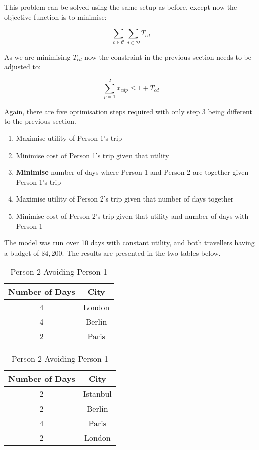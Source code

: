 \documentclass[12pt]{article}
\begin{document}
This problem can be solved using the same setup as before, except now the objective function is to minimise:

\begin{equation*}
	\sum_{c \in \mathcal{C}} \sum_{d \in \mathcal{D}} T_{cd}
\end{equation*}

As we are minimising $T_{cd}$ now the constraint in the previous section needs to be adjusted to:

\begin{equation*}
	\sum_{p = 1}^{2} x_{cdp} \leq 1 + T_{cd}
\end{equation*}

Again, there are five optimisation steps required with only step 3 being different to the previous section.

\begin{enumerate}
	\item Maximise utility of Person 1's trip
	\item Minimise cost of Person 1's trip given that utility
	\item \textbf{Minimise} number of days where Person 1 and Person 2 are together given Person 1's trip
	\item Maximise utility of Person 2's trip given that number of days together
	\item Minimise cost of Person 2's trip given that utility and number of days with Person 1
\end{enumerate}

The model was run over 10 days with constant utility, and both travellers having a budget of $\$4,200$. The results are presented in the two tables below.

\begin{table}[ht!]
	\centering
	\begin{minipage}{0.48\textwidth}
		\centering
		\begin{tabular}{| c || c |}
			\hline
			Number of Days & City \\ \hline \hline
			4 & London \\ \hline
			4 & Berlin \\ \hline
			2 & Paris \\ \hline
		\end{tabular}
		\caption{Person 1}
		\label{person_1_avoid}
	\end{minipage}
	\hfill
	\begin{minipage}{0.48\textwidth}
		\centering
		\begin{tabular}{| c || c |}
			\hline
			Number of Days & City \\ \hline \hline
			2 & Istanbul \\ \hline
			2 & Berlin \\ \hline
			4 & Paris \\ \hline
			2 & London \\ \hline
		\end{tabular}
			\caption{Person 2 Avoiding Person 1}
		\label{person_2_avoid}
	\end{minipage}
\end{table}
\end{document}
